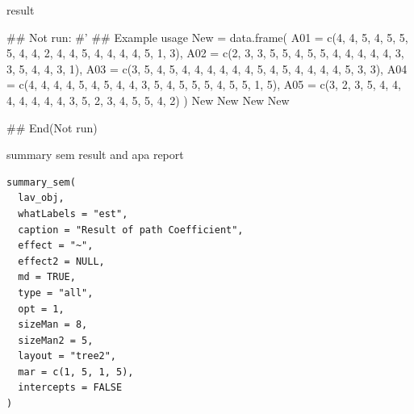 \documentclass[a4paper]{book}
\begin{document}
%
\begin{Value}
result
\end{Value}
%
\begin{Examples}
\begin{ExampleCode}
\#\# Not run: 
#'
## Example usage
New = data.frame(
  A01 = c(4, 4, 5, 4, 5, 5, 5, 4, 4, 2, 4, 4, 5, 4, 4, 4, 4, 5, 1, 3),
  A02 = c(2, 3, 3, 5, 5, 4, 5, 5, 4, 4, 4, 4, 4, 3, 3, 5, 4, 4, 3, 1),
  A03 = c(3, 5, 4, 5, 4, 4, 4, 4, 4, 4, 5, 4, 5, 4, 4, 4, 4, 5, 3, 3),
  A04 = c(4, 4, 4, 4, 5, 4, 5, 4, 4, 3, 5, 4, 5, 5, 5, 4, 5, 5, 1, 5),
  A05 = c(3, 2, 3, 5, 4, 4, 4, 4, 4, 4, 4, 3, 5, 2, 3, 4, 5, 5, 4, 2)
)
New %
New %
New %
New %

## End(Not run)

\end{ExampleCode}
\end{Examples}
%
\begin{Description}
summary sem result and apa report
\end{Description}
%
\begin{Usage}
\begin{verbatim}
summary_sem(
  lav_obj,
  whatLabels = "est",
  caption = "Result of path Coefficient",
  effect = "~",
  effect2 = NULL,
  md = TRUE,
  type = "all",
  opt = 1,
  sizeMan = 8,
  sizeMan2 = 5,
  layout = "tree2",
  mar = c(1, 5, 1, 5),
  intercepts = FALSE
)
\end{verbatim}
\end{Usage}
%
\end{document}
